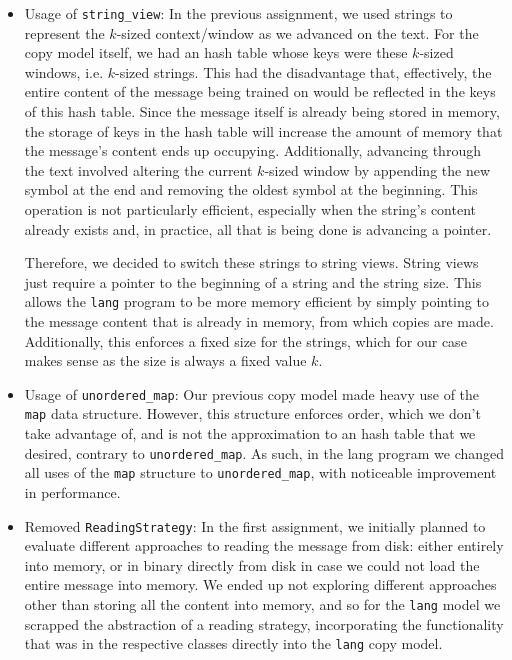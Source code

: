 \documentclass{article}
\begin{document}
\begin{itemize}
    \item Usage of \texttt{string\_view}:
    In the previous assignment, we used strings to represent the $k$-sized context/window as we advanced on the text.
    For the copy model itself, we had an hash table whose keys were these $k$-sized windows, i.e. $k$-sized strings.
    This had the disadvantage that, effectively, the entire content of the message being trained on would be reflected in the keys of this hash table.
    Since the message itself is already being stored in memory, the storage of keys in the hash table will increase the amount of memory that the message's content ends up occupying.
    Additionally, advancing through the text involved altering the current $k$-sized window by appending the new symbol at the end and removing the oldest symbol at the beginning.
    This operation is not particularly efficient, especially when the string's content already exists and, in practice, all that is being done is advancing a pointer.

    Therefore, we decided to switch these strings to string views.
    String views just require a pointer to the beginning of a string and the string size.
    This allows the \texttt{lang} program to be more memory efficient by simply pointing to the message content that is already in memory, from which copies are made.
    Additionally, this enforces a fixed size for the strings, which for our case makes sense as the size is always a fixed value $k$.
    
    \item Usage of \texttt{unordered\_map}:
    Our previous copy model made heavy use of the \texttt{map} data structure.
    However, this structure enforces order, which we don't take advantage of, and is not the approximation to an hash table that we desired, contrary to \texttt{unordered\_map}.
    As such, in the lang program we changed all uses of the \texttt{map} structure to \texttt{unordered\_map}, with noticeable improvement in performance.
    
    \item Removed \texttt{ReadingStrategy}:
    In the first assignment, we initially planned to evaluate different approaches to reading the message from disk: either entirely into memory, or in binary directly from disk in case we could not load the entire message into memory.
    We ended up not exploring different approaches other than storing all the content into memory, and so for the \texttt{lang} model we scrapped the abstraction of a reading strategy, incorporating the functionality that was in the respective classes directly into the \texttt{lang} copy model.
\end{itemize}
\end{document}
